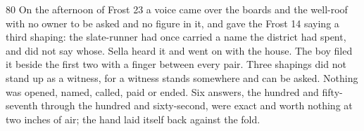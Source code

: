 \begin{CRchronicle}{80}
On the afternoon of Frost 23 a voice came over the boards and the well-roof with no owner to be asked and no figure in it, and gave the Frost 14 saying a third shaping: the slate-runner had once carried a name the district had spent, and did not say whose. Sella heard it and went on with the house. The boy filed it beside the first two with a finger between every pair. Three shapings did not stand up as a witness, for a witness stands somewhere and can be asked. Nothing was opened, named, called, paid or ended. Six answers, the hundred and fifty-seventh through the hundred and sixty-second, were exact and worth nothing at two inches of air; the hand laid itself back against the fold.
\end{CRchronicle}

